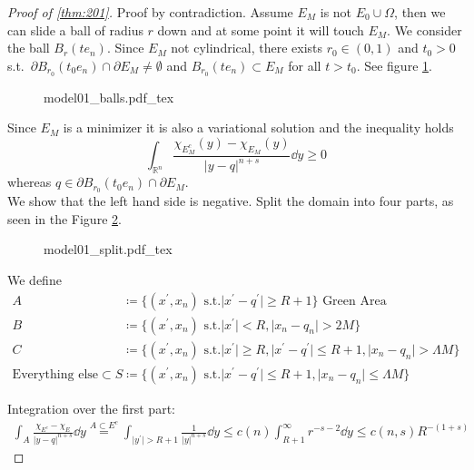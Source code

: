 \begin{proof}[Proof of \cref{thm:201}]
	Proof by contradiction. Assume \( E_M \) is not \( E_0 \cup \Omega \), then we can
	slide a ball of radius \( r \) down and at some point it will touch \( E_M \). We
	consider the ball \( B_r (t e_n) \). Since \( E_M \) not cylindrical, there exists \(
	r_0 \in (0,1) \) and \( t_0 > 0 \) s.t.\ \( \partial B_{r_0}(t_0 e_n) \cap \partial
	E_M \neq \emptyset \) and \( B_{r_0}(t e_n) \subset E_M \) for all \( t > t_0 \). See
	figure \cref{fig:202}.
	\begin{figure}[h]
		\centering
		\def\svgwidth{0.5\textwidth}
		{model01_balls.pdf_tex}
		\caption{}
		\label{fig:202}
	\end{figure}

	Since \( E_M \) is a minimizer it is also a variational solution and the inequality
	holds
	\[
		\int_{\mathbb{R}^n} \frac{\chi_{E_M^c}(y)-\chi_{E_M} (y)}{\lvert y-q\rvert^{n+s}} \dd{y} \geq 0
	\]
	whereas \( q \in \partial B_{r_0}(t_0 e_n) \cap \partial E_M \). \\
	We show that the left hand side is negative. Split the domain into four parts, as seen
	in the Figure \cref{fig:203}.
	\begin{figure}[h]
		\centering
		\def\svgwidth{0.5\textwidth}
		{model01_split.pdf_tex}
		\caption{}
		\label{fig:203}
	\end{figure}
	We define
	\begin{align*}
		A                                & \coloneqq \{ (x^\prime,x_n) \text{ s.t.} \lvert x^\prime -q^\prime \rvert \geq R+1\} \text{ Green Area} \\
		B                                & \coloneqq \{ (x^\prime,x_n) \text{ s.t.} \lvert x^\prime \rvert < R, \lvert x_n -q_n \rvert > 2M \} \\
		C                                & \coloneqq \{ (x^\prime,x_n) \text{ s.t.} \lvert x^\prime \rvert \geq R, \lvert x^\prime - q^\prime \rvert \leq R+1, \lvert x_n -q_n \rvert > \Lambda M \} \\
		\text{Everything else} \subset S & \coloneqq \{(x^\prime,x_n) \text{ s.t.} \lvert x^\prime -q^\prime \rvert \leq R+1, \lvert x_n -q_n \rvert \leq \Lambda M \}
	\end{align*}


	Integration over the first part:
	\begin{gather*}
		\int_A \frac{\chi_{E^c} -\chi_E}{\lvert y-q\rvert^{n+s}} \dd{y} \overset{A \subset E^c}{ =} \int_{ \lvert y^\prime \rvert > R+1} \frac{1}{\lvert y \rvert^{n+s}} \dd{y} \leq c(n) \int_{R+1}^\infty r^{-s-2} \dd{y} \leq c(n,s) R^{-(1+s)}
	\end{gather*}


\end{proof}
